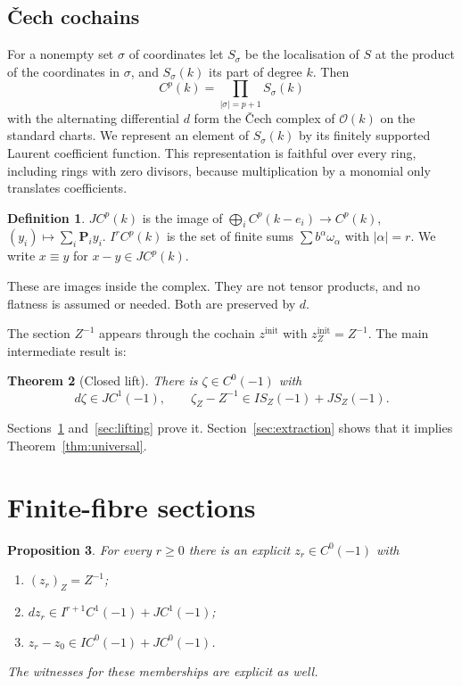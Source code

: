 \documentclass[11pt]{amsart}
\numberwithin{equation}{section}
\newtheorem{theorem}{Theorem}[section]
\newtheorem{proposition}[theorem]{Proposition}
\theoremstyle{definition}
\newtheorem{definition}[theorem]{Definition}
\theoremstyle{remark}
\begin{document}
\subsection{\v Cech cochains}
For a nonempty set $\sigma$ of coordinates let $S_\sigma$ be the
localisation of $S$ at the product of the coordinates in $\sigma$, and
$S_\sigma(k)$ its part of degree $k$. Then
\[
 C^p(k)=\prod_{|\sigma|=p+1}S_\sigma(k)
\]
with the alternating differential $d$ form the \v Cech complex of
$\mathcal O(k)$ on the standard charts. We represent an element of
$S_\sigma(k)$ by its finitely supported Laurent coefficient function.
This representation is faithful over every ring, including rings with
zero divisors, because multiplication by a monomial only translates
coefficients.

\begin{definition}
$JC^p(k)$ is the image of
$\bigoplus_iC^p(k-e_i)\to C^p(k)$, $(y_i)\mapsto\sum_i\mathbf P_iy_i$.
$I^rC^p(k)$ is the set of finite sums $\sum b^\alpha\omega_\alpha$ with
$|\alpha|=r$. We write $x\equiv y$ for $x-y\in JC^p(k)$.
\end{definition}

These are images inside the complex. They are not tensor products,
and no flatness is assumed or needed. Both are preserved by $d$.

The section $Z^{-1}$ appears through the cochain $z^{\mathrm{init}}$
with $z^{\mathrm{init}}_Z=Z^{-1}$. The main intermediate result is:

\begin{theorem}[Closed lift]\label{thm:closed}
There is $\zeta\in C^0(-1)$ with
\[
 d\zeta\in JC^1(-1),\qquad \zeta_Z-Z^{-1}\in IS_Z(-1)+JS_Z(-1).
\]
\end{theorem}

Sections~\ref{sec:sections} and~\ref{sec:lifting} prove it.
Section~\ref{sec:extraction} shows that it implies
Theorem~\ref{thm:universal}.

\section{Finite-fibre sections}\label{sec:sections}

\begin{proposition}\label{prop:sections}
For every $r\ge0$ there is an explicit $z_r\in C^0(-1)$ with
\begin{enumerate}
\item $(z_r)_Z=Z^{-1}$;
\item $dz_r\in I^{r+1}C^1(-1)+JC^1(-1)$;
\item $z_r-z_0\in IC^0(-1)+JC^0(-1)$.
\end{enumerate}
The witnesses for these memberships are explicit as well.
\end{proposition}
\end{document}
